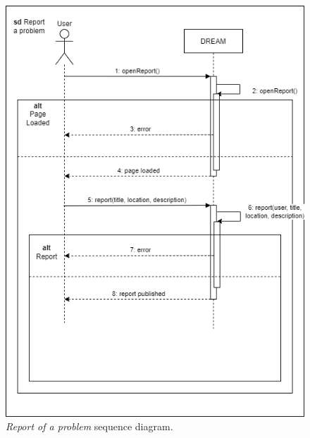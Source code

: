\begin{figure}[H]
    \centering
    \includegraphics[width=\linewidth]{Images/Use Case/UC4.png}
    \caption{\textit{Report of a problem} sequence diagram.}
\end{figure}
\newpage

